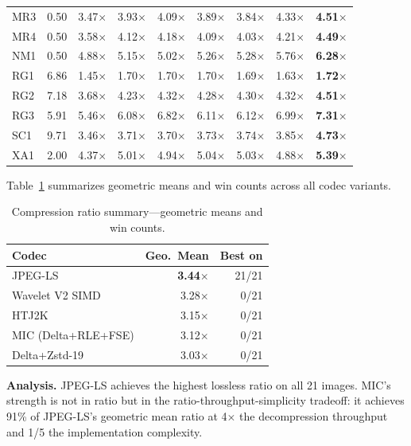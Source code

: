 \documentclass[journal]{IEEEtran}
\begin{document}
\begin{table}[t]
\begin{tabular}{lrrrrrrrr}
MR3  & 0.50 & 3.47$\times$ & 3.93$\times$ & 4.09$\times$ & 3.89$\times$ & 3.84$\times$ & 4.33$\times$ & \textbf{4.51$\times$} \\
MR4  & 0.50 & 3.58$\times$ & 4.12$\times$ & 4.18$\times$ & 4.09$\times$ & 4.03$\times$ & 4.21$\times$ & \textbf{4.49$\times$} \\
NM1  & 0.50 & 4.88$\times$ & 5.15$\times$ & 5.02$\times$ & 5.26$\times$ & 5.28$\times$ & 5.76$\times$ & \textbf{6.28$\times$} \\
RG1  & 6.86 & 1.45$\times$ & 1.70$\times$ & 1.70$\times$ & 1.70$\times$ & 1.69$\times$ & 1.63$\times$ & \textbf{1.72$\times$} \\
RG2  & 7.18 & 3.68$\times$ & 4.23$\times$ & 4.32$\times$ & 4.28$\times$ & 4.30$\times$ & 4.32$\times$ & \textbf{4.51$\times$} \\
RG3  & 5.91 & 5.46$\times$ & 6.08$\times$ & 6.82$\times$ & 6.11$\times$ & 6.12$\times$ & 6.99$\times$ & \textbf{7.31$\times$} \\
SC1  & 9.71 & 3.46$\times$ & 3.71$\times$ & 3.70$\times$ & 3.73$\times$ & 3.74$\times$ & 3.85$\times$ & \textbf{4.73$\times$} \\
XA1  & 2.00 & 4.37$\times$ & 5.01$\times$ & 4.94$\times$ & 5.04$\times$ & 5.03$\times$ & 4.88$\times$ & \textbf{5.39$\times$} \\
\bottomrule
\end{tabular}
\end{table}

Table~\ref{tab:ratio-summary} summarizes geometric means and win counts across
all codec variants.

\begin{table}[htbp]
\centering
\caption{Compression ratio summary---geometric means and win counts.}
\label{tab:ratio-summary}
\begin{tabular}{lrr}
\toprule
Codec & Geo.\ Mean & Best on \\
\midrule
JPEG-LS & \textbf{3.44$\times$} & 21/21 \\
Wavelet V2 SIMD & 3.28$\times$ & 0/21 \\
HTJ2K & 3.15$\times$ & 0/21 \\
MIC (Delta+RLE+FSE) & 3.12$\times$ & 0/21 \\
Delta+Zstd-19 & 3.03$\times$ & 0/21 \\
\bottomrule
\end{tabular}
\end{table}

\textbf{Analysis.} JPEG-LS achieves the highest lossless ratio on all 21
images. MIC's strength is not in ratio but in the ratio-throughput-simplicity
tradeoff: it achieves 91\% of JPEG-LS's geometric mean ratio at 4$\times$ the
decompression throughput and 1/5 the implementation complexity.
\end{document}
